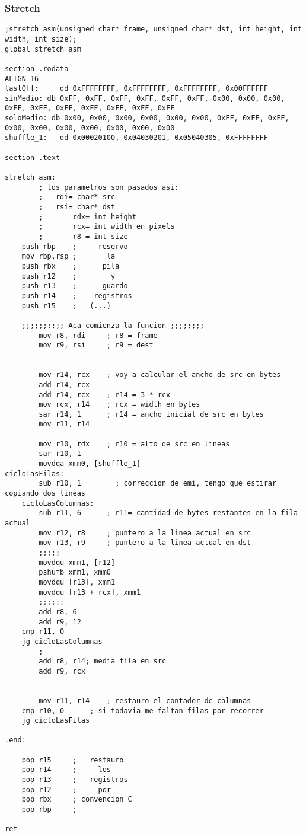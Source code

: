 \subsubsection{Stretch}
\begin{verbatim}
;stretch_asm(unsigned char* frame, unsigned char* dst, int height, int width, int size);
global stretch_asm

section .rodata
ALIGN 16
lastOff:     dd 0xFFFFFFFF, 0xFFFFFFFF, 0xFFFFFFFF, 0x00FFFFFF
sinMedio: db 0xFF, 0xFF, 0xFF, 0xFF, 0xFF, 0xFF, 0x00, 0x00, 0x00, 0xFF, 0xFF, 0xFF, 0xFF, 0xFF, 0xFF, 0xFF
soloMedio: db 0x00, 0x00, 0x00, 0x00, 0x00, 0x00, 0xFF, 0xFF, 0xFF, 0x00, 0x00, 0x00, 0x00, 0x00, 0x00, 0x00
shuffle_1:   dd 0x00020100, 0x04030201, 0x05040305, 0xFFFFFFFF 

section .text

stretch_asm:
        ; los parametros son pasados asi:
        ;	rdi= char* src
        ;	rsi= char* dst
        ;       rdx= int height
        ;       rcx= int width en pixels
        ;       r8 = int size
	push rbp	;     reservo
	mov rbp,rsp	;       la
	push rbx	;      pila
	push r12	;        y
	push r13	;      guardo
	push r14	;    registros
	push r15	;   (...)

	;;;;;;;;;; Aca comienza la funcion ;;;;;;;;
        mov r8, rdi     ; r8 = frame
        mov r9, rsi     ; r9 = dest
        
        
        mov r14, rcx    ; voy a calcular el ancho de src en bytes
        add r14, rcx
        add r14, rcx    ; r14 = 3 * rcx
        mov rcx, r14    ; rcx = width en bytes
        sar r14, 1      ; r14 = ancho inicial de src en bytes
        mov r11, r14
        
        mov r10, rdx    ; r10 = alto de src en lineas
        sar r10, 1
        movdqa xmm0, [shuffle_1]
cicloLasFilas:
        sub r10, 1        ; correccion de emi, tengo que estirar copiando dos lineas
    cicloLasColumnas:        
        sub r11, 6      ; r11= cantidad de bytes restantes en la fila actual
        mov r12, r8     ; puntero a la linea actual en src
        mov r13, r9     ; puntero a la linea actual en dst
        ;;;;;
        movdqu xmm1, [r12]
        pshufb xmm1, xmm0
        movdqu [r13], xmm1
        movdqu [r13 + rcx], xmm1
        ;;;;;;
        add r8, 6
        add r9, 12
    cmp r11, 0
    jg cicloLasColumnas
        ;
        add r8, r14; media fila en src
        add r9, rcx


        mov r11, r14    ; restauro el contador de columnas
    cmp r10, 0      ; si todavia me faltan filas por recorrer
    jg cicloLasFilas

.end:

	pop r15		;   restauro
	pop r14		;     los
	pop r13		;   registros
	pop r12		;     por
	pop rbx		; convencion C
	pop rbp		;

ret

\end{verbatim}
